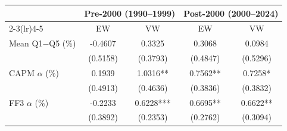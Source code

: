 \begin{tabular}{lcccc}
\toprule
 & \multicolumn{2}{c}{Pre-2000 (1990--1999)} & \multicolumn{2}{c}{Post-2000 (2000--2024)} \\
\cmidrule(lr){2-3}\cmidrule(lr){4-5}
 & EW & VW & EW & VW \\
\midrule
Mean Q1$-$Q5 (\%) & -0.4607 & 0.3325 & 0.3068 & 0.0984 \\
 & (0.5158) & (0.3793) & (0.4847) & (0.5296) \\
CAPM $\alpha$ (\%) & 0.1939 & 1.0316** & 0.7562** & 0.7258* \\
 & (0.4913) & (0.4636) & (0.3836) & (0.3832) \\
FF3 $\alpha$ (\%) & -0.2233 & 0.6228*** & 0.6695** & 0.6622** \\
 & (0.3892) & (0.2353) & (0.2762) & (0.3094) \\
\bottomrule
\end{tabular}
